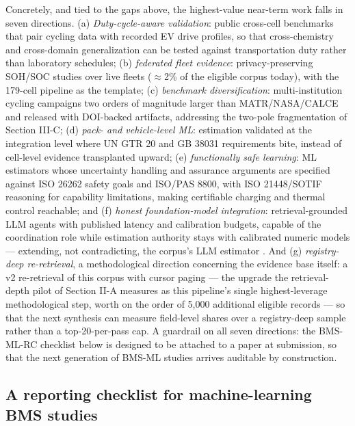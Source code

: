 \documentclass[journal]{IEEEtran}
\begin{document}
Concretely, and tied to the gaps above, the highest-value near-term work falls in seven directions. (a) \textit{Duty-cycle-aware validation}: public cross-cell benchmarks that pair cycling data with recorded EV drive profiles, so that cross-chemistry and cross-domain generalization can be tested against transportation duty rather than laboratory schedules; (b) \textit{federated fleet evidence}: privacy-preserving SOH/SOC studies over live fleets ($\approx$2\% of the eligible corpus today), with the 179-cell pipeline as the template; (c) \textit{benchmark diversification}: multi-institution cycling campaigns two orders of magnitude larger than MATR/NASA/CALCE and released with DOI-backed artifacts, addressing the two-pole fragmentation of Section III-C; (d) \textit{pack- and vehicle-level ML}: estimation validated at the integration level where UN GTR 20 and GB 38031 requirements bite, instead of cell-level evidence transplanted upward; (e) \textit{functionally safe learning}: ML estimators whose uncertainty handling and assurance arguments are specified against ISO 26262 safety goals and ISO/PAS 8800, with ISO 21448/SOTIF reasoning for capability limitations, making certifiable charging and thermal control reachable; and (f) \textit{honest foundation-model integration}: retrieval-grounded LLM agents with published latency and calibration budgets, capable of the coordination role while estimation authority stays with calibrated numeric models --- extending, not contradicting, the corpus's LLM estimator \cite{r15}. And (g) \textit{registry-deep re-retrieval}, a methodological direction concerning the evidence base itself: a v2 re-retrieval of this corpus with cursor paging --- the upgrade the retrieval-depth pilot of Section II-A measures as this pipeline's single highest-leverage methodological step, worth on the order of 5,000 additional eligible records --- so that the next synthesis can measure field-level shares over a registry-deep sample rather than a top-20-per-pass cap. A guardrail on all seven directions: the BMS-ML-RC checklist below is designed to be attached to a paper at submission, so that the next generation of BMS-ML studies arrives auditable by construction.

\subsection{A reporting checklist for machine-learning BMS studies}
\end{document}
